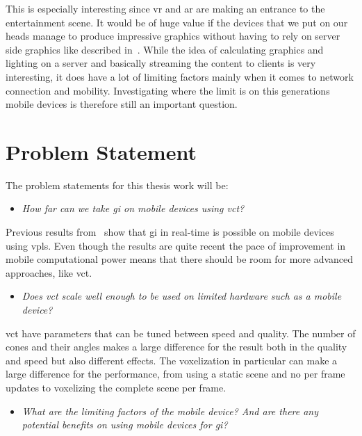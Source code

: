 This is especially interesting since \gls{vr} and \gls{ar} are making an entrance to the entertainment scene. It would be of huge value if the devices that we put on our heads manage to produce impressive graphics without having to rely on server side graphics like described in~\cite{cloudlight}. While the idea of calculating graphics and lighting on a server and basically streaming the content to clients is very interesting, it does have a lot of limiting factors mainly when it comes to network connection and mobility. Investigating where the limit is on this generations mobile devices is therefore still an important question.

\section{Problem Statement}

The problem statements for this thesis work will be:

\begin{itemize}
  \item \textit{How far can we take \gls{gi} on mobile devices using \gls{vct}?}
\end{itemize}

Previous results from~\cite{gimobile} show that \gls{gi} in real-time is possible on mobile devices using \glspl{vpl}. Even though the results are quite recent the pace of improvement in mobile computational power means that there should be room for more advanced approaches, like \gls{vct}.

\begin{itemize}
  \item \textit{Does \gls{vct} scale well enough to be used on limited hardware such as a mobile device?}
\end{itemize}

\gls{vct} have parameters that can be tuned between speed and quality. The number of cones and their angles makes a large difference for the result both in the quality and speed but also different effects. The voxelization in particular can make a large difference for the performance, from using a static scene and no per frame updates to voxelizing the complete scene per frame.

\begin{itemize}
  \item \textit{What are the limiting factors of the mobile device? And are there any potential benefits on using mobile devices for \gls{gi}?}
\end{itemize}

